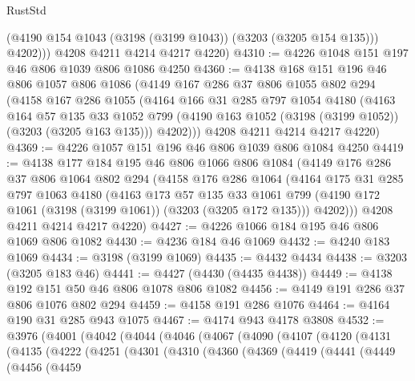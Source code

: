 \begin{lexlean}{RustStd}
\begin{coremodule}
            (@4190 @154 @1043 (@3198 (@3199 @1043)) (@3203 (@3205 @154 @135)))
            @4202)))
      @4208
      @4211
      @4214
      @4217
      @4220)
@4310 := @4226 @1048 @151 @197 @46 @806 @1039 @806 @1086 @4250
@4360 := @4138
    @168
    @151
    @196
    @46
    @806
    @1057
    @806
    @1086
    (@4149
      @167
      @286
      @37
      @806
      @1055
      @802
      @294
      (@4158
        @167
        @286
        @1055
        (@4164
          @166
          @31
          @285
          @797
          @1054
          @4180
          (@4163
            @164
            @57
            @135
            @33
            @1052
            @799
            (@4190 @163 @1052 (@3198 (@3199 @1052)) (@3203 (@3205 @163 @135)))
            @4202)))
      @4208
      @4211
      @4214
      @4217
      @4220)
@4369 := @4226 @1057 @151 @196 @46 @806 @1039 @806 @1084 @4250
@4419 := @4138
    @177
    @184
    @195
    @46
    @806
    @1066
    @806
    @1084
    (@4149
      @176
      @286
      @37
      @806
      @1064
      @802
      @294
      (@4158
        @176
        @286
        @1064
        (@4164
          @175
          @31
          @285
          @797
          @1063
          @4180
          (@4163
            @173
            @57
            @135
            @33
            @1061
            @799
            (@4190 @172 @1061 (@3198 (@3199 @1061)) (@3203 (@3205 @172 @135)))
            @4202)))
      @4208
      @4211
      @4214
      @4217
      @4220)
@4427 := @4226 @1066 @184 @195 @46 @806 @1069 @806 @1082
@4430 := @4236 @184 @46 @1069
@4432 := @4240 @183 @1069
@4434 := @3198 (@3199 @1069)
@4435 := @4432 @4434
@4438 := @3203 (@3205 @183 @46)
@4441 := @4427 (@4430 (@4435 @4438))
@4449 := @4138 @192 @151 @50 @46 @806 @1078 @806 @1082
@4456 := @4149 @191 @286 @37 @806 @1076 @802 @294
@4459 := @4158 @191 @286 @1076
@4464 := @4164 @190 @31 @285 @943 @1075
@4467 := @4174 @943 @4178 @3808
@4532 := @3976
    (@4001
      (@4042
        (@4044
          (@4046
            (@4067
              (@4090
                (@4107
                  (@4120
                    (@4131
                      (@4135
                        (@4222
                          (@4251
                            (@4301
                              (@4310
                                (@4360
                                  (@4369
                                    (@4419
                                      (@4441
                                        (@4449
                                          (@4456
                                            (@4459

\end{coremodule}
\end{lexlean}
